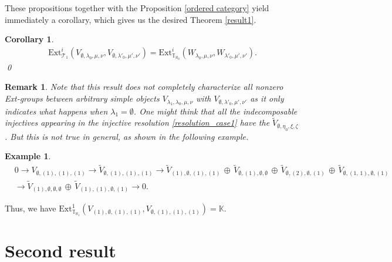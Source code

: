 \documentclass[openany, a4paper]{amsbook}
\newtheorem{cor}[thm]{Corollary}
\newtheorem{rmk}[thm]{Remark}
\theoremstyle{definition}
\newtheorem{exmp}[thm]{Example}
\numberwithin{equation}{chapter}
\newcommand{\T}[1]{{\mathbb{T}}_{\aleph_{#1}}}
\newcommand{\Ext}[4]{\mathrm{Ext}^{#1}_{#2}({#3}, {#4})}
\begin{document}
These propositions together with the Proposition \ref{ordered category} yield immediately a corollary, which gives us the desired Theorem \ref{result1}.
\begin{cor}
    \begin{align}
        \Ext{i}{\mathcal{T}_1}{V_{\emptyset, \lambda_0, \mu, \nu}}{V_{\emptyset, \lambda'_0, \mu', \nu'}} =\Ext{i}{\T{0}}{W_{\lambda_0, \mu, \nu}}{W_{\lambda'_0, \mu', \nu'}}.
    \end{align}
    \qed
\end{cor}


\begin{rmk}
    Note that this result does not completely characterize all nonzero Ext-groups between arbitrary simple objects $V_{\lambda_1, \lambda_0, \mu, \nu}$ with $V_{\emptyset, \lambda'_0, \mu', \nu'}$ as it only indicates what happens when $\lambda_1 = \emptyset$. One might think that all the indecomposable injectives appearing in the injective resolution \ref{resolution_case1} have the $\tilde{V}_{\emptyset, \eta_0, \xi, \zeta}$. But this is not true in general, as shown in the following example. 
\end{rmk}

\begin{exmp}
    \begin{align*}
        & 0 \rightarrow 
        V_{ \emptyset, (1), (1), (1) }\rightarrow
        \tilde{V}_{ \emptyset, (1), (1), (1) }
        \rightarrow
        \tilde{V}_{ (1), \emptyset, (1), (1) }\,\oplus\,\tilde{V}_{ \emptyset, (1), \emptyset, \emptyset }\,\oplus\,\tilde{V}_{ \emptyset, (2), \emptyset, (1) }\,\oplus\,\tilde{V}_{ \emptyset, (1,\,1), \emptyset, (1) } \\ &
        \rightarrow
        \tilde{V}_{ (1), \emptyset, \emptyset, \emptyset }\,\oplus\,\tilde{V}_{ (1), (1), \emptyset, (1) }
        \rightarrow 0.
    \end{align*}
    
    Thus, we have $\Ext{1}{\T{1}}{{V}_{ (1), \emptyset, (1), (1) }}{V_{ \emptyset, (1), (1), (1) }} = \mathbb{K}$.
\end{exmp}

\section{Second result}
\end{document}
